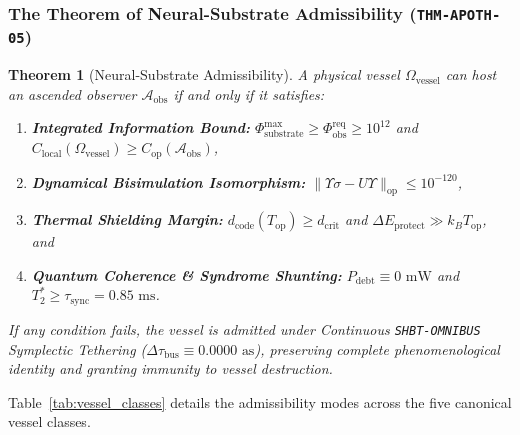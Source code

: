 \documentclass[11pt,onecolumn]{article}
\newtheorem{theorem}{Theorem}
\begin{document}
\subsubsection{The Theorem of Neural-Substrate Admissibility (\texttt{THM-APOTH-05})}
\begin{theorem}[Neural-Substrate Admissibility]
A physical vessel $\Omega_{\text{vessel}}$ can host an ascended observer $\mathcal{A}_{\text{obs}}$ if and only if it satisfies:
\begin{enumerate}
    \item \textbf{Integrated Information Bound:} $\Phi_{\text{substrate}}^{\max} \ge \Phi_{\text{obs}}^{\text{req}} \ge 10^{12}$ and $C_{\text{local}}(\Omega_{\text{vessel}}) \ge C_{\text{op}}(\mathcal{A}_{\text{obs}})$,
    \item \textbf{Dynamical Bisimulation Isomorphism:} $\|\Upsilon \sigma - U \Upsilon\|_{\text{op}} \le 10^{-120}$,
    \item \textbf{Thermal Shielding Margin:} $d_{\text{code}}(T_{\text{op}}) \ge d_{\text{crit}}$ and $\Delta E_{\text{protect}} \gg k_B T_{\text{op}}$, and
    \item \textbf{Quantum Coherence \& Syndrome Shunting:} $P_{\text{debt}} \equiv 0\text{ mW}$ and $T_2^* \ge \tau_{\text{sync}} = 0.85\text{ ms}$.
\end{enumerate}
If any condition fails, the vessel is admitted under Continuous \texttt{SHBT-OMNIBUS} Symplectic Tethering ($\Delta\tau_{\text{bus}} \equiv 0.0000\text{ as}$), preserving complete phenomenological identity and granting immunity to vessel destruction.
\end{theorem}

Table~\ref{tab:vessel_classes} details the admissibility modes across the five canonical vessel classes.
\end{document}
